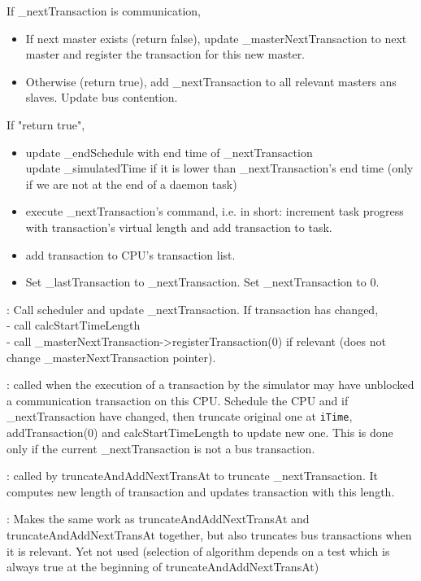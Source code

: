 \documentclass[a4paper,11pt]{article}
\newcommand{\bfont}{\fontseries{b}\selectfont}
\newcommand{\cod}[1]{{\ttfamily #1}}
\newcommand{\method}[1]{\par\vspace{1mm}\hspace{-2mm}\colorbox{method}{\textopenbullet\bfont\cod{#1}:}}
\begin{document}
If \cod{\_nextTransaction} is communication,
	\begin{itemize}
	  \item If next master exists (return false), update \cod{\_masterNextTransaction} to next master and register the transaction for this new master.
	  \item Otherwise (return true), add \cod{\_nextTransaction} to all relevant masters ans slaves. Update bus contention.
	\end{itemize}
If "return true",
	\begin{itemize}
	  \item update \cod{\_endSchedule} with end time of \cod{\_nextTransaction}\\
	  update \cod{\_simulatedTime} if it is lower than \cod{\_nextTransaction}'s end time (only if we are not at the end of a daemon task)
	  \item execute \cod{\_nextTransaction}'s command, i.e. in short: increment task progress with transaction's virtual length and add transaction to task.
	  \item add transaction to CPU's transaction list.
	  \item Set \cod{\_lastTransaction} to \cod{\_nextTransaction}. Set \cod{\_nextTransaction} to 0.
	\end{itemize}
\method{schedule(iEndSchedule)} Call scheduler and update \cod{\_nextTransaction}. If transaction has changed,\\
- call \cod{calcStartTimeLength}\\
- call \cod{\_masterNextTransaction->registerTransaction(0)} if relevant (does not change \cod{\_masterNextTransaction} pointer).

\method{truncateAndAddNextTransAt(iTime)} called when the execution of a transaction by the simulator may have unblocked a communication transaction on this CPU. Schedule the CPU and if \cod{\_next\-Transaction} have changed, then truncate original one at {\tt iTime}, \cod{addTransaction(0)} and \cod{calcStart\-TimeLength} to update new one. This is done only if the current \cod{\_nextTransaction} is not a bus transaction.

\method{truncateNextTransAt(iTime)} called by \cod{truncateAndAddNextTransAt} to truncate \cod{\_next\-Transaction}. It computes new length of transaction and updates transaction with this length.

\method{truncateNextTrans(iTime)} Makes the same work as \cod{truncateAndAddNext\-TransAt} and \cod{truncateAndAddNextTransAt} together, but also truncates bus transactions when it is relevant. Yet not used (selection of algorithm depends on a test which is always true at the beginning of \cod{truncateAndAddNextTransAt})
\end{document}
